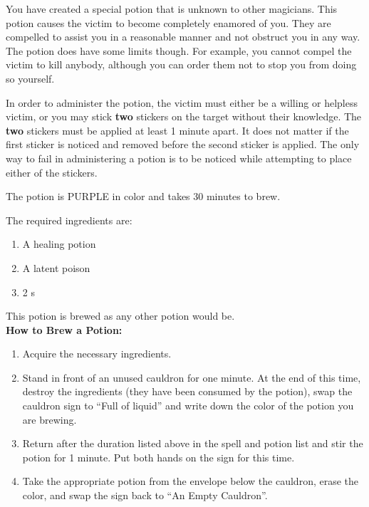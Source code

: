 \documentclass[green]{NeptuneBall}
\begin{document}
\name{\gLove{}}

You have created a special potion that is unknown to other magicians. This potion causes the victim to become completely enamored of you. They are compelled to assist you in a reasonable manner and not obstruct you in any way. The potion does have some limits though. For example, you cannot compel the victim to kill anybody, although you can order them not to stop you from doing so yourself.

In order to administer the potion, the victim must either be a willing or helpless victim, or you may stick {\bf two} stickers on the target without their knowledge. The {\bf two} stickers must be applied at least 1 minute apart. It does not matter if the first sticker is noticed and removed before the second sticker is applied. The only way to fail in administering a potion is to be noticed while attempting to place either of the stickers.

The potion is PURPLE in color and takes 30 minutes to brew.

The required ingredients are:
\begin{enumerate}
\item A healing potion 
\item A latent poison
\item 2 \iPearl{}s
\end{enumerate}

This potion is brewed as any other potion would be.\\

{\bf How to Brew a Potion:}\\ %
\begin{enumerate}
  \item Acquire the necessary ingredients.
  \item Stand in front of an unused cauldron for one minute. At the end of this time, destroy the ingredients (they have been consumed by the potion), swap the cauldron sign to ``Full of liquid'' and write down the color of the potion you are brewing.
  \item Return after the duration listed above in the spell and potion list and stir the potion for 1 minute. Put both hands on the sign for this time.
  \item Take the appropriate potion from the envelope below the cauldron, erase the color, and swap the sign back to ``An Empty Cauldron''.
\end{enumerate}
\end{document}
